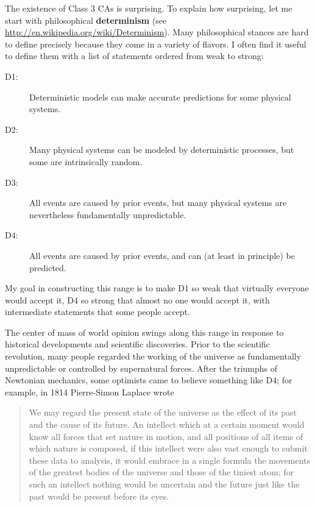 \documentclass[12pt]{book}
\theoremstyle{exercise}
\begin{document}
The existence of Class 3 CAs is surprising.  To explain how
surprising, let me start with philosophical
{\bf determinism} (see \url{http://en.wikipedia.org/wiki/Determinism}).
Many philosophical stances are hard to define precisely because
they come in a variety of flavors.  I often find it useful
to define them with a list of statements ordered from weak
to strong:

\begin{description}

\item[D1:] Deterministic models can make accurate predictions
for some physical systems.

\item[D2:] Many physical systems can be modeled by deterministic
processes, but some are intrinsically random.

\item[D3:] All events are caused by prior events, but many
physical systems are nevertheless fundamentally unpredictable.

\item[D4:] All events are caused by prior events, and can (at
least in principle) be predicted.


\end{description}

My goal in constructing this range is to make D1 so weak that
virtually everyone would accept it, D4 so strong that almost no one
would accept it, with intermediate statements that some people accept.

The center of mass of world opinion swings along this range in
response to historical developments and scientific discoveries.  Prior
to the scientific revolution, many people regarded the working of the
universe as fundamentally unpredictable or controlled by supernatural
forces.  After the triumphs of Newtonian mechanics, some optimists
came to believe something like D4; for example, in 1814 Pierre-Simon
Laplace wrote


\begin{quote}
We may regard the present state of the universe as the effect of its
past and the cause of its future. An intellect which at a certain
moment would know all forces that set nature in motion, and all
positions of all items of which nature is composed, if this intellect
were also vast enough to submit these data to analysis, it would
embrace in a single formula the movements of the greatest bodies of
the universe and those of the tiniest atom; for such an intellect
nothing would be uncertain and the future just like the past would be
present before its eyes.
\end{quote}
\end{document}
